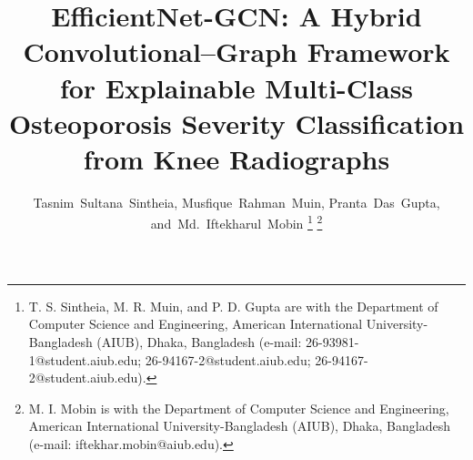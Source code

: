 \documentclass[journal]{IEEEtran}
\begin{document}
\title{EfficientNet-GCN: A Hybrid Convolutional--Graph Framework for
Explainable Multi-Class Osteoporosis Severity Classification from
Knee Radiographs}

\author{Tasnim~Sultana~Sintheia,
        Musfique~Rahman~Muin,
        Pranta~Das~Gupta,
        and~Md.~Iftekharul~Mobin%
\thanks{T. S. Sintheia, M. R. Muin, and P. D. Gupta are with the Department of
Computer Science and Engineering, American International University-Bangladesh
(AIUB), Dhaka, Bangladesh (e-mail: 26-93981-1@student.aiub.edu;
26-94167-2@student.aiub.edu;
26-94167-2@student.aiub.edu).}%
\thanks{M. I. Mobin is with the Department of Computer Science and Engineering,
American International University-Bangladesh (AIUB), Dhaka, Bangladesh
(e-mail: iftekhar.mobin@aiub.edu).}}

\maketitle
\end{document}
